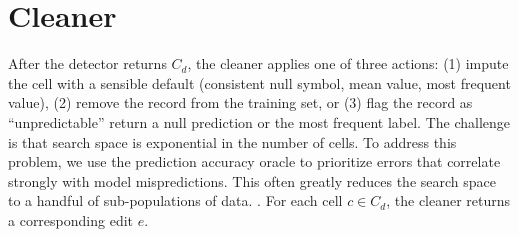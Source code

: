 \section{Cleaner}
After the detector returns $C_{d}$, the cleaner applies one of three actions: (1) impute the cell with a sensible default (consistent null symbol, mean value, most frequent value), (2) remove the record from the training set, or (3) flag the record as ``unpredictable'' return a null prediction or the most frequent label. The challenge is that search space is exponential in the number of cells. To address this problem, we use the prediction accuracy oracle to prioritize errors that correlate strongly with model mispredictions. This often greatly reduces the search space to a handful of sub-populations of data. . For each cell $c \in C_{d}$, the cleaner returns a corresponding edit $e$.